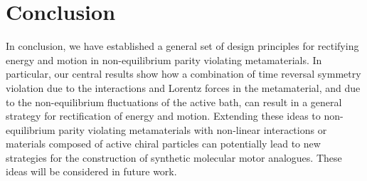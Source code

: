 \documentclass[
 preprint,
 preprintnumbers,
 amsmath,amssymb,
 aps,
 pre,
 longbibliography,
 superscriptaddress,
 10pt, twocolumn
]{revtex4-1}
\begin{document}


\section{Conclusion} \label{sec:conclusion}

In conclusion, we have established a general set of design principles for rectifying energy and motion in non-equilibrium parity violating metamaterials. In particular, our central results show how a combination of time reversal symmetry violation due to the interactions and Lorentz forces in the metamaterial, and due to the non-equilibrium fluctuations of the active bath, can result in a general strategy for rectification of energy and motion. Extending these ideas to non-equilibrium parity violating metamaterials with non-linear interactions or materials composed of active chiral particles can potentially lead to new strategies for the construction of synthetic molecular motor analogues. These ideas will be considered in future work. 


\end{document}
